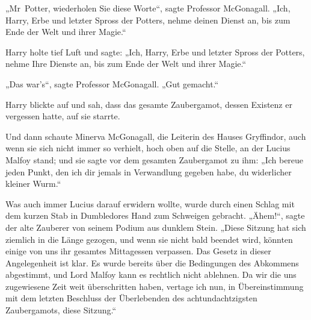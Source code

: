 „Mr~Potter, wiederholen Sie diese Worte“, sagte Professor McGonagall.
„Ich, Harry, Erbe und letzter Spross der Potters, nehme deinen Dienst an, bis zum Ende der Welt und ihrer Magie.“

Harry holte tief Luft und sagte:
„Ich, Harry, Erbe und letzter Spross der Potters, nehme Ihre Dienste an, bis zum Ende der Welt und ihrer Magie.“

„Das war’s“, sagte Professor McGonagall.
„Gut gemacht.“

Harry blickte auf und sah, dass das gesamte Zaubergamot, dessen Existenz er vergessen hatte, auf sie starrte.

Und dann schaute Minerva McGonagall, die Leiterin des Hauses Gryffindor, auch wenn sie sich nicht immer so verhielt, hoch oben auf die Stelle, an der Lucius Malfoy stand; und sie sagte vor dem gesamten Zaubergamot zu ihm:
„Ich bereue jeden Punkt, den ich dir jemals in Verwandlung gegeben habe, du widerlicher kleiner Wurm.“

Was auch immer Lucius darauf erwidern wollte, wurde durch einen Schlag mit dem kurzen Stab in Dumbledores Hand zum Schweigen gebracht. „Ähem!“, sagte der alte Zauberer von seinem Podium aus dunklem Stein.
„Diese Sitzung hat sich ziemlich in die Länge gezogen, und wenn sie nicht bald beendet wird, könnten einige von uns ihr gesamtes Mittagessen verpassen. Das Gesetz in dieser Angelegenheit ist klar. Es wurde bereits über die Bedingungen des Abkommens abgestimmt, und Lord Malfoy kann es rechtlich nicht ablehnen. Da wir die uns zugewiesene Zeit weit überschritten haben, vertage ich nun, in Übereinstimmung mit dem letzten Beschluss der Überlebenden des achtundachtzigsten Zaubergamots, diese Sitzung.“

